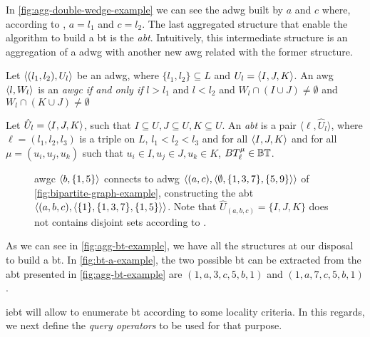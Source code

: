 In \autoref{fig:agg-double-wedge-example} we can see the \acrshort{adwg} built by $a$ and $c$ where, according to , $a = l_1$ and $c = l_2$.
The last aggregated structure that enable the algorithm to build a \acrshort{bt} is the \emph{\acrlong{abt}}. 
Intuitively, this intermediate structure is an aggregation of a \acrshort{adwg} with another new \acrshort{awg} related with the former structure.

\begin{definition}\label{def:awgc}
Let $\left\langle (l_1, l_2), U_l \right\rangle$ be an \acrshort{adwg}, where $\{l_1,l_2\}\subseteq L$ and $U_l = \left\langle I, J, K\right\rangle$.
An \acrshort{awg} $\left\langle l, W_l \right\rangle$ is an \textit{\acrfull{awgc}} \emph{if and only if} $l > l_1$ and $l < l_2$ and $W_l \cap (I \cup J) \neq \emptyset$ and $W_l \cap (K \cup J) \neq \emptyset$
\end{definition}
      
\begin{definition}\label{def:abt}
Let $\hat{U}_l=\left\langle I, J, K\right\rangle$, such that $I \subseteq U, J \subseteq U, K \subseteq U$. An \textit{\acrfull{abt}}  is a pair  $\langle \ell, \hat{U}_l\rangle$, 
where $\ell=(l_1, l_2, l_3)$ is a triple on $L$, $l_1 < l_2 < l_3$ and for all $\left\langle I, J, K\right\rangle$ and for all $\mu=(u_i, u_j, u_k)$ such that $u_i \in I, u_j \in J, u_k \in K$, $BT_{\ell}^{\mu}\in \mathbb{BT}$.
\end{definition}
      
\begin{figure}[h!]
\centering      
{}
\caption[{[\acrshort{iebt}] Example Aggregated bitriangle}]{%
\acrlong{awgc} $\left\langle b, \{1,5\}\right\rangle$ connects to \acrlong{adwg} $\left\langle (a,c), \left\langle \emptyset, \{1,3,7\}, \{5,9\}\right\rangle \right\rangle$ of \autoref{fig:bipartite-graph-example}, constructing the \acrlong{abt} $\left\langle (a,b,c), \left\langle \{1\},\{1,3,7\},\{1,5\} \right\rangle \right\rangle$.
Note that $\hat{U}_{(a,b,c)}=\{I,J,K\}$ does not contains disjoint sets according to . 
}
\label{fig:agg-bt-example}
\end{figure}
      
As we can see in \autoref{fig:agg-bt-example}, we have all the structures at our disposal to build a \acrshort{bt}. 
In \autoref{fig:bt-a-example}, the two possible \acrshort{bt} can be extracted from the \acrshort{abt} presented in \autoref{fig:agg-bt-example} are $(1,a,3,c,5,b,1)$ and $(1,a,7,c,5,b,1)$.

\acrshort{iebt} will allow to enumerate \acrshort{bt} according to some locality criteria.
In this regards, we next define the \emph{query operators} to be used for that purpose.

